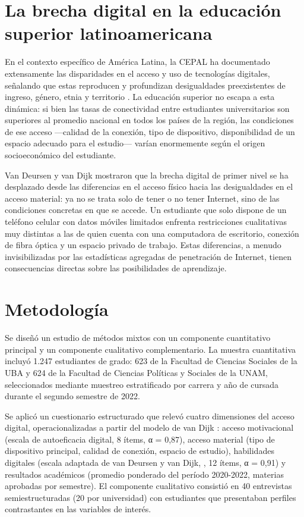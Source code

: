 \section{La brecha digital en la educación superior latinoamericana}
En el contexto específico de América Latina, la CEPAL ha documentado extensamente las disparidades en el acceso y uso de tecnologías digitales, señalando que estas reproducen y profundizan desigualdades preexistentes de ingreso, género, etnia y territorio \autocite{2566-CEPAL2021}. La educación superior no escapa a esta dinámica: si bien las tasas de conectividad entre estudiantes universitarios son superiores al promedio nacional en todos los países de la región, las condiciones de ese acceso —calidad de la conexión, tipo de dispositivo, disponibilidad de un espacio adecuado para el estudio— varían enormemente según el origen socioeconómico del estudiante.

Van Deursen y van Dijk \autocite*{2564-VANDEURSEN2019} mostraron que la brecha digital de primer nivel se ha desplazado desde las diferencias en el acceso físico hacia las desigualdades en el acceso material: ya no se trata solo de tener o no tener Internet, sino de las condiciones concretas en que se accede. Un estudiante que solo dispone de un teléfono celular con datos móviles limitados enfrenta restricciones cualitativas muy distintas a las de quien cuenta con una computadora de escritorio, conexión de fibra óptica y un espacio privado de trabajo. Estas diferencias, a menudo invisibilizadas por las estadísticas agregadas de penetración de Internet, tienen consecuencias directas sobre las posibilidades de aprendizaje.


\section{Metodología}
Se diseñó un estudio de métodos mixtos con un componente cuantitativo principal y un componente cualitativo complementario. La muestra cuantitativa incluyó 1.247 estudiantes de grado: 623 de la Facultad de Ciencias Sociales de la UBA y 624 de la Facultad de Ciencias Políticas y Sociales de la UNAM, seleccionados mediante muestreo estratificado por carrera y año de cursada durante el segundo semestre de 2022.

Se aplicó un cuestionario estructurado que relevó cuatro dimensiones del acceso digital, operacionalizadas a partir del modelo de van Dijk \autocite*{2563-VANDIJK2020}: acceso motivacional (escala de autoeficacia digital, 8 ítems, α = 0,87), acceso material (tipo de dispositivo principal, calidad de conexión, espacio de estudio), habilidades digitales (escala adaptada de van Deursen y van Dijk, \autocite*{2564-VANDEURSEN2019}, 12 ítems, α = 0,91) y resultados académicos (promedio ponderado del período 2020-2022, materias aprobadas por semestre). El componente cualitativo consistió en 40 entrevistas semiestructuradas (20 por universidad) con estudiantes que presentaban perfiles contrastantes en las variables de interés.


